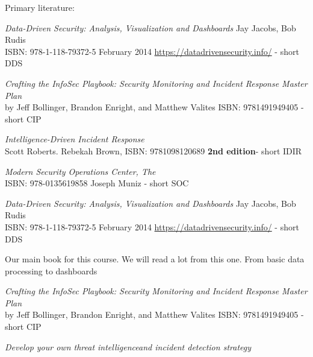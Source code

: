 \documentclass[Screen16to9,17pt]{foils}
\begin{document}

Primary literature:
\begin{list2}
\item \emph{Data-Driven Security: Analysis, Visualization and Dashboards} Jay Jacobs, Bob Rudis\\
ISBN: 978-1-118-79372-5 February 2014 \url{https://datadrivensecurity.info/} - short DDS
\item \emph{Crafting the InfoSec Playbook: Security Monitoring and Incident Response Master Plan}\\
 by Jeff Bollinger, Brandon Enright, and Matthew Valites ISBN: 9781491949405 - short CIP
\item \emph{Intelligence-Driven Incident Response} \\
 Scott Roberts. Rebekah Brown, ISBN: 9781098120689 {\bf 2nd edition}- short IDIR

\item \emph{Modern Security Operations Center, The}\\
ISBN: 978-0135619858 Joseph Muniz - short SOC
\end{list2}



\emph{Data-Driven Security: Analysis, Visualization and Dashboards} Jay Jacobs, Bob Rudis\\
ISBN: 978-1-118-79372-5 February 2014 \url{https://datadrivensecurity.info/} - short DDS

Our main book for this course. We will read a lot from this one. From basic data processing to dashboards



\emph{Crafting the InfoSec Playbook: Security Monitoring and Incident Response Master Plan}\\
 by Jeff Bollinger, Brandon Enright, and Matthew Valites ISBN: 9781491949405 - short CIP

\emph{Develop your own threat intelligenceand incident detection strategy}


\end{document}
